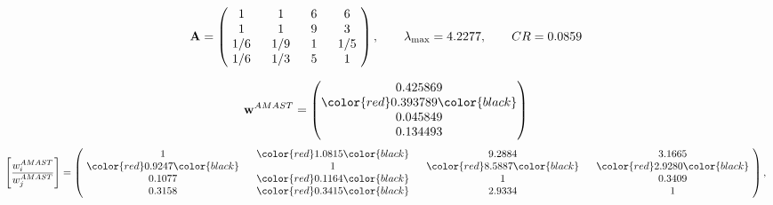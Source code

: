 \begin{example}
\begin{equation*}
\mathbf{A} =
\begin{pmatrix}
$\,\,$ 1 $\,\,$ & $\,\,$1$\,\,$ & $\,\,$6$\,\,$ & $\,\,$6 $\,\,$ \\
$\,\,$ 1 $\,\,$ & $\,\,$ 1 $\,\,$ & $\,\,$9$\,\,$ & $\,\,$3 $\,\,$ \\
$\,\,$ 1/6$\,\,$ & $\,\,$ 1/9$\,\,$ & $\,\,$ 1 $\,\,$ & $\,\,$ 1/5 $\,\,$ \\
$\,\,$ 1/6$\,\,$ & $\,\,$ 1/3$\,\,$ & $\,\,$5$\,\,$ & $\,\,$ 1  $\,\,$ \\
\end{pmatrix},
\qquad
\lambda_{\max} =
4.2277,
\qquad
CR = 0.0859
\end{equation*}

\begin{equation*}
\mathbf{w}^{AMAST} =
\begin{pmatrix}
0.425869\\
\color{red} 0.393789\color{black} \\
0.045849\\
0.134493
\end{pmatrix}\end{equation*}
\begin{equation*}
\left[ \frac{{w}^{AMAST}_i}{{w}^{AMAST}_j} \right] =
\begin{pmatrix}
$\,\,$ 1 $\,\,$ & $\,\,$\color{red} 1.0815\color{black} $\,\,$ & $\,\,$9.2884$\,\,$ & $\,\,$3.1665$\,\,$ \\
$\,\,$\color{red} 0.9247\color{black} $\,\,$ & $\,\,$ 1 $\,\,$ & $\,\,$\color{red} 8.5887\color{black} $\,\,$ & $\,\,$\color{red} 2.9280\color{black}   $\,\,$ \\
$\,\,$0.1077$\,\,$ & $\,\,$\color{red} 0.1164\color{black} $\,\,$ & $\,\,$ 1 $\,\,$ & $\,\,$0.3409 $\,\,$ \\
$\,\,$0.3158$\,\,$ & $\,\,$\color{red} 0.3415\color{black} $\,\,$ & $\,\,$2.9334$\,\,$ & $\,\,$ 1  $\,\,$ \\
\end{pmatrix},
\end{equation*}


\end{example}
